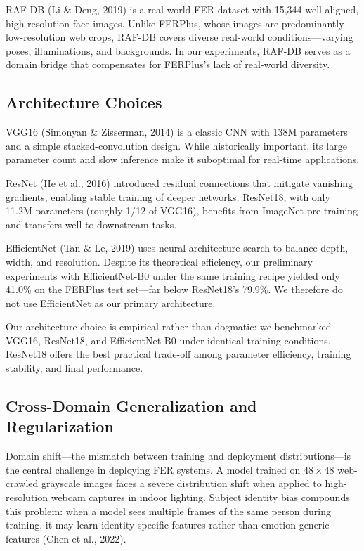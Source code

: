 \documentclass[12pt,a4paper]{article}
\begin{document}
RAF-DB (Li \& Deng, 2019) is a real-world FER dataset with 15,344 well-aligned, high-resolution face images. Unlike FERPlus, whose images are predominantly low-resolution web crops, RAF-DB covers diverse real-world conditions---varying poses, illuminations, and backgrounds. In our experiments, RAF-DB serves as a domain bridge that compensates for FERPlus's lack of real-world diversity.

\subsection{Architecture Choices}

VGG16 (Simonyan \& Zisserman, 2014) is a classic CNN with 138M parameters and a simple stacked-convolution design. While historically important, its large parameter count and slow inference make it suboptimal for real-time applications.

ResNet (He et al., 2016) introduced residual connections that mitigate vanishing gradients, enabling stable training of deeper networks. ResNet18, with only 11.2M parameters (roughly 1/12 of VGG16), benefits from ImageNet pre-training and transfers well to downstream tasks.

EfficientNet (Tan \& Le, 2019) uses neural architecture search to balance depth, width, and resolution. Despite its theoretical efficiency, our preliminary experiments with EfficientNet-B0 under the same training recipe yielded only 41.0\% on the FERPlus test set---far below ResNet18's 79.9\%. We therefore do not use EfficientNet as our primary architecture.

Our architecture choice is empirical rather than dogmatic: we benchmarked VGG16, ResNet18, and EfficientNet-B0 under identical training conditions. ResNet18 offers the best practical trade-off among parameter efficiency, training stability, and final performance.

\subsection{Cross-Domain Generalization and Regularization}

Domain shift---the mismatch between training and deployment distributions---is the central challenge in deploying FER systems. A model trained on $48\times48$ web-crawled grayscale images faces a severe distribution shift when applied to high-resolution webcam captures in indoor lighting. Subject identity bias compounds this problem: when a model sees multiple frames of the same person during training, it may learn identity-specific features rather than emotion-generic features (Chen et al., 2022).
\end{document}
